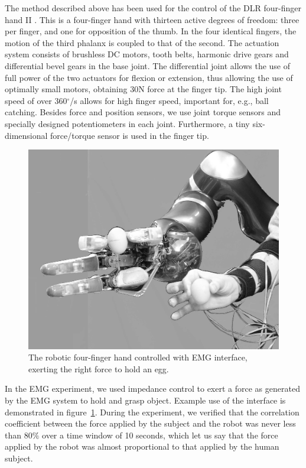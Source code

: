 The method described above has been used for the control of the DLR
four-finger hand II \cite{ButFisGre2004}. This is a four-finger hand
with thirteen active degrees of freedom: three per finger, and one for
opposition of the thumb.  In the four identical fingers, the motion of
the third phalanx is coupled to that of the second. The actuation
system consists of brushless DC motors, tooth belts, harmonic drive
gears and differential bevel gears in the base joint. The differential
joint allows the use of full power of the two actuators for flexion or
extension, thus allowing the use of optimally small motors, obtaining
30N force at the finger tip. The high joint speed of over
360$^\circ$/s allows for high finger speed, important for, e.g., ball
catching. Besides force and position sensors, we use joint torque
sensors and specially designed potentiometers in each joint.
Furthermore, a tiny six-dimensional force/torque sensor is used in the
finger tip.

\begin{figure}
  \includegraphics[width=\columnwidth]{figs/egg-in-hand.jpg}
  \caption{The robotic four-finger hand controlled with EMG interface, exerting the right force to hold an egg.}
  \label{fig:egg-hand}
\end{figure}

In the EMG experiment, we used impedance control to exert a force as
generated by the EMG system to hold and grasp object. Example use of
the interface is demonstrated in figure~\ref{fig:egg-hand}. During the
experiment, we verified that the correlation coefficient between the
force applied by the subject and the robot was never less than $80\%$
over a time window of 10 seconds, which let us say that the force
applied by the robot was almost proportional to that applied by the
human subject.
